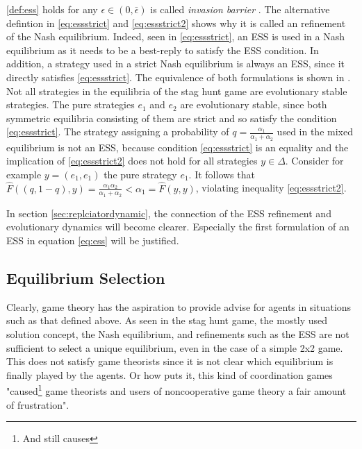 \documentclass[11pt]{article}
\begin{document}
\ref{def:ess} holds for any $\epsilon \in (0,\bar{\epsilon})$ is called  
\textit{invasion barrier} \cite{weibull_evolutionary_1997}. 
The alternative defintion in \eqref{eq:essstrict} and \eqref{eq:essstrict2}
shows why it is called an refinement of the Nash equilibrium. Indeed,
seen in \eqref{eq:essstrict}, an ESS is used in a Nash equilibrium as it 
needs to be a best-reply to satisfy the ESS condition. In addition, 
a strategy used in a strict Nash equilibrium is always an ESS, 
since it directly satisfies 
\eqref{eq:essstrict}. The equivalence of both formulations is shown in
\cite{weibull_evolutionary_1997}.
Not all strategies in the equilibria of the stag hunt game are evolutionary
stable strategies. The pure strategies $e_1$ and $e_2$ are evolutionary stable,
since both symmetric equilibria consisting of them are strict and so 
satisfy the condition \eqref{eq:essstrict}. The strategy assigning 
a probability of $q=\frac{\alpha_1}{\alpha_1 + \alpha_2}$ used in the 
mixed equilibrium is not an ESS, because condition \eqref{eq:essstrict} is
an equality and the implication of \eqref{eq:essstrict2} does not hold for all
strategies $y \in \Delta$.
Consider for example $y =(e_1,e_1)$ the pure strategy $e_1$. It follows that
$\hat{F}((q,1-q),y) = \frac{\alpha_1 \alpha_2}{\alpha_1+\alpha_2}
< \alpha_1 = \hat{F}(y,y)$, violating inequality \eqref{eq:essstrict2}.

In section \ref{sec:replciatordynamic}, the connection of the ESS refinement
and evolutionary dynamics will become clearer. Especially the first formulation
of an ESS in equation \eqref{eq:ess} will be justified.

\subsection{Equilibrium Selection}
\label{sec:equilibriumselection}
Clearly, game theory has the aspiration to provide advise for agents in 
situations such as that defined above.
As seen in the stag hunt game, the mostly used solution concept, 
the Nash equilibrium, and refinements such as the ESS are
not sufficient to select a unique equilibrium, even in the case of a simple
2x2 game. This does not satisfy game theorists since it is not clear which
equilibrium is finally played by the agents. Or how \cite{weibull} puts it,
this kind of coordination games "caused\footnote{And still causes} game theorists and users of 
noncooperative game theory a fair amount of frustration". 
\end{document}
